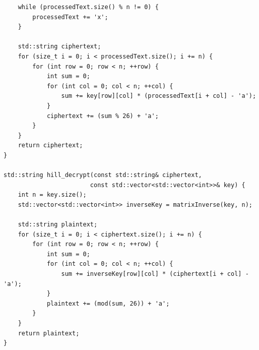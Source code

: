 \documentclass[titlepage]{article}
\begin{document}
\begin{lstlisting}
    while (processedText.size() % n != 0) {
        processedText += 'x';
    }

    std::string ciphertext;
    for (size_t i = 0; i < processedText.size(); i += n) {
        for (int row = 0; row < n; ++row) {
            int sum = 0;
            for (int col = 0; col < n; ++col) {
                sum += key[row][col] * (processedText[i + col] - 'a');
            }
            ciphertext += (sum % 26) + 'a';
        }
    }
    return ciphertext;
}

std::string hill_decrypt(const std::string& ciphertext, 
                        const std::vector<std::vector<int>>& key) {
    int n = key.size();
    std::vector<std::vector<int>> inverseKey = matrixInverse(key, n);

    std::string plaintext;
    for (size_t i = 0; i < ciphertext.size(); i += n) {
        for (int row = 0; row < n; ++row) {
            int sum = 0;
            for (int col = 0; col < n; ++col) {
                sum += inverseKey[row][col] * (ciphertext[i + col] - 'a');
            }
            plaintext += (mod(sum, 26)) + 'a';
        }
    }
    return plaintext;
}
\end{lstlisting}
\end{document}
